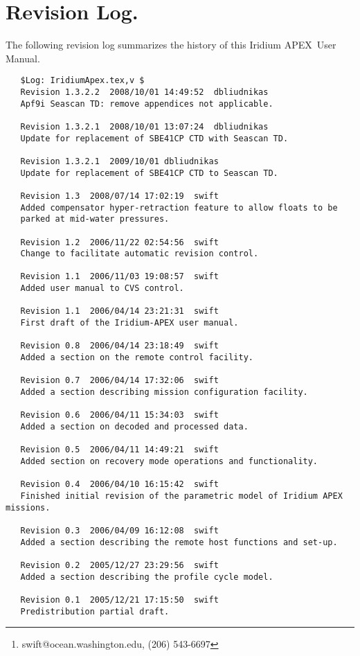 \documentclass[10pt]{article}
\title{\titlename}
\author{
  Generated by Teledyne Webb Research\\
  82 Technology Park Drive\\
  East Falmouth, Massachusetts 02536\\
   \\
  Original Courtesy of Dana Swift\thanks{swift@ocean.washington.edu, (206) 543-6697}\\
  School of Oceanography\\
  University of Washington\\
  Seattle, Washington 98195}
\date{\today}
\newcommand{\apex}{APEX}
\begin{document}
\maketitle
\newpage 
{} 

\section*{Revision Log.}
  
The following revision log summarizes the history of this Iridium \apex\
User Manual.

\begin{verbatim}
   $Log: IridiumApex.tex,v $
   Revision 1.3.2.2  2008/10/01 14:49:52  dbliudnikas
   Apf9i Seascan TD: remove appendices not applicable.

   Revision 1.3.2.1  2008/10/01 13:07:24  dbliudnikas
   Update for replacement of SBE41CP CTD with Seascan TD.

   Revision 1.3.2.1  2009/10/01 dbliudnikas
   Update for replacement of SBE41CP CTD to Seascan TD.
   
   Revision 1.3  2008/07/14 17:02:19  swift
   Added compensator hyper-retraction feature to allow floats to be
   parked at mid-water pressures.

   Revision 1.2  2006/11/22 02:54:56  swift
   Change to facilitate automatic revision control.

   Revision 1.1  2006/11/03 19:08:57  swift
   Added user manual to CVS control.

   Revision 1.1  2006/04/14 23:21:31  swift
   First draft of the Iridium-APEX user manual.

   Revision 0.8  2006/04/14 23:18:49  swift
   Added a section on the remote control facility.

   Revision 0.7  2006/04/14 17:32:06  swift
   Added a section describing mission configuration facility.

   Revision 0.6  2006/04/11 15:34:03  swift
   Added a section on decoded and processed data.

   Revision 0.5  2006/04/11 14:49:21  swift
   Added section on recovery mode operations and functionality.

   Revision 0.4  2006/04/10 16:15:42  swift
   Finished initial revision of the parametric model of Iridium APEX missions.

   Revision 0.3  2006/04/09 16:12:08  swift
   Added a section describing the remote host functions and set-up.

   Revision 0.2  2005/12/27 23:29:56  swift
   Added a section describing the profile cycle model.

   Revision 0.1  2005/12/21 17:15:50  swift
   Predistribution partial draft.
\end{verbatim} 
\newpage 
\end{document}
